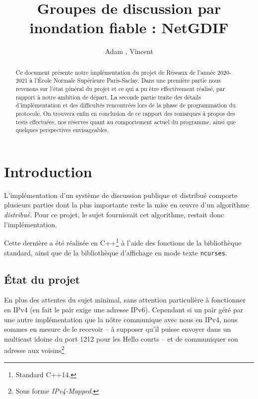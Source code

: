 \documentclass[11pt,a4paper]{article}
\title{Groupes de discussion par inondation fiable : NetGDIF}
\author{Adam \bsc{Phillips}, Vincent \bsc{Bonczak}}
\begin{document}
  \maketitle
	
	\begin{abstract}
	Ce document présente notre implémentation du projet de Réseaux de l'année 2020-2021 à l'École Normale Supérieure Paris-Saclay. Dans une première partie
	nous revenons sur l'état général du projet et ce qui a pu être effectivement réalisé, par rapport à notre ambition de départ. La seconde partie traite 
	des détails d'implémentation et des difficultés rencontrées lors de la phase de programmation du protocole. On trouvera enfin en conclusion de ce rapport
	des remarques à propos des tests effectuées, nos réserves quant au comportement actuel du programme, ainsi que quelques perspectives envisageables.
	\end{abstract}
	
	
\section{Introduction}

L'implémentation d'un système de discussion publique et distribué comporte plusieurs parties dont la plus importante reste la mise en œuvre d'un algorithme \emph{distribué}. Pour ce projet, le sujet fournissait cet algorithme, restait donc l'implémentation.

Cette dernière a été réalisée en C++\footnote{Standard C++14.} à l'aide  des fonctions de la bibliothèque standard, ainsi que de la bibliothèque d'affichage en mode texte \texttt{ncurses}.

\subsection{État du projet}


En plus des attentes du sujet minimal, sans attention particulière à fonctionner en IPv4 (en fait le pair exige une adresse IPv6). Cependant si un pair géré par
une autre implémentation que la nôtre communique avec nous en IPv4, nous sommes en mesure de le recevoir -- à supposer qu'il puisse envoyer dans un multicast 
idoine du port 1212 pour les Hello courts -- et de communiquer son adresse aux voisins\footnote{Sous forme \emph{IPv4-Mapped}.} 
\end{document}
